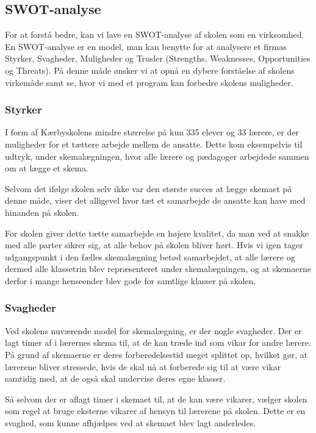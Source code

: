 \subsection{SWOT-analyse}
For at forstå \school bedre, kan vi lave en SWOT-analyse af skolen som en virksomhed. En SWOT-analyse er en model, man kan benytte for at analysere et firmas Styrker, Svagheder, Muligheder og Trusler (Strengths, Weaknesses, Opportunities og Threats). På denne måde ønsker vi at opnå en dybere forståelse af skolens virkemåde samt se, hvor vi med et program kan forbedre skolens muligheder.

\subsubsection*{Styrker}
I form af Kærbyskolens mindre størrelse på kun 335 elever og 33 lærere\cite{Kaerbyskolens-laerere}, er der muligheder for et tættere arbejde mellem de ansatte. Dette kom eksempelvis til udtryk, under skemalægningen, hvor alle lærere og pædagoger arbejdede sammen om at lægge et skema.

Selvom det ifølge skolen selv ikke var den største succes at lægge skemaet på denne måde, viser det alligevel hvor tæt et samarbejde de ansatte kan have med hinanden på skolen.

For skolen giver dette tætte samarbejde en højere kvalitet, da man ved at snakke med alle parter sikrer sig, at alle behov på skolen bliver hørt. Hvis vi igen tager udgangspunkt i den fælles skemalægning betød samarbejdet, at alle lærere og dermed alle klassetrin blev repræsenteret under skemalægningen, og at skemaerne derfor i mange henseender blev gode for samtlige klasser på skolen. 

\subsubsection*{Svagheder}
Ved skolens nuværende model for skemalægning, er der nogle svagheder. Der er lagt timer af i lærernes skema til, at de kan træde ind som vikar for andre lærere. På grund af skemaerne er deres forberedelsestid meget splittet op, hvilket gør, at lærerene bliver stressede, hvis de skal nå at forberede sig til at være vikar samtidig med, at de også skal undervise deres egne klasser.

Så selvom der er aflagt timer i skemaet til, at de kan være vikarer, vælger skolen som regel at bruge eksterne vikarer af hensyn til lærerene på skolen. Dette er en svaghed, som kunne afhjælpes ved at skemaet blev lagt anderledes.

